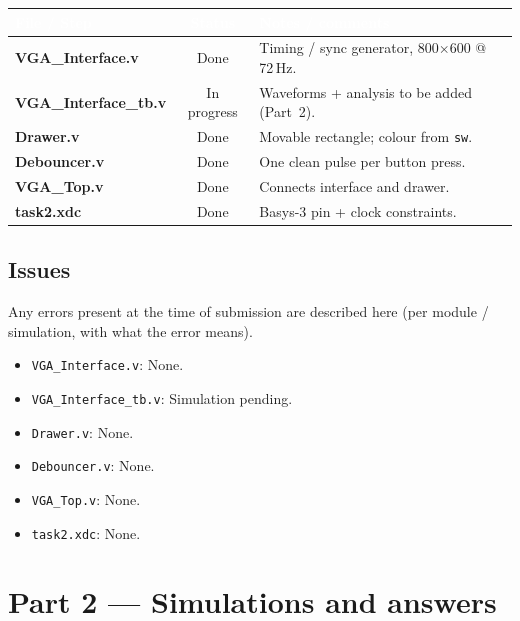 \documentclass[11pt,a4paper]{article}
\begin{document}
\vspace{4pt}
\renewcommand{\arraystretch}{1.5}
\begin{tabularx}{\textwidth}{|>{\bfseries\ttfamily}l|c|X|}
\hline
\rowcolor{accent}
\textcolor{white}{\textbf{File / Step}} & \textcolor{white}{\textbf{Status}} & \textcolor{white}{\textbf{Notes / comments}} \\ \hline
\rowcolor{accentlt}
VGA\_Interface.v     & Done & Timing / sync generator, 800$\times$600 @ 72\,Hz. \\ \hline
VGA\_Interface\_tb.v & In progress & Waveforms + analysis to be added (Part~2). \\ \hline
\rowcolor{accentlt}
Drawer.v             & Done & Movable rectangle; colour from \texttt{sw}. \\ \hline
Debouncer.v          & Done & One clean pulse per button press. \\ \hline
\rowcolor{accentlt}
VGA\_Top.v           & Done & Connects interface and drawer. \\ \hline
task2.xdc            & Done & Basys-3 pin + clock constraints. \\ \hline
\end{tabularx}
\renewcommand{\arraystretch}{1.0}

\subsection*{Issues}

Any errors present at the time of submission are described here (per module /
simulation, with what the error means).

\begin{itemize}[topsep=2pt,itemsep=2pt,leftmargin=1.4em]
  \item \texttt{VGA\_Interface.v}: None.
  \item \texttt{VGA\_Interface\_tb.v}: Simulation pending.
  \item \texttt{Drawer.v}: None.
  \item \texttt{Debouncer.v}: None.
  \item \texttt{VGA\_Top.v}: None.
  \item \texttt{task2.xdc}: None.
\end{itemize}

\newpage
\section*{Part 2 --- Simulations and answers}
\vspace{1cm}
\end{document}
